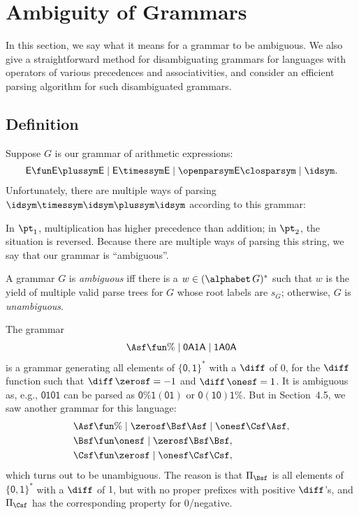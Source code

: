 \section{Ambiguity of Grammars}
\label{AmbiguityOfGrammars}

In this section, we say what it means for a grammar to be ambiguous.
We also give a straightforward method for disambiguating
grammars for languages with operators of various precedences and
associativities, and consider an efficient parsing algorithm for
such disambiguated grammars.

\subsection{Definition}

Suppose $G$ is our grammar of arithmetic expressions:
\begin{gather*}
\mathsf{E\fun E\plussym E\mid E\timessym E\mid \openparsym E\closparsym \mid
\idsym} .
\end{gather*}
Unfortunately,
there are multiple ways of parsing
$\idsym\timessym\idsym\plussym\idsym$ according to this grammar:
\begin{center}

\end{center}
In $\pt_1$, multiplication has higher precedence than addition; in
$\pt_2$, the situation is reversed.  Because there are multiple ways
of parsing this string, we say that our grammar is ``ambiguous''.

A grammar $G$ is \emph{ambiguous} iff there is a
$w\in(\alphabet\,G)^*$ such that $w$ is the yield of multiple valid
parse trees for $G$ whose root labels are $s_G$; otherwise, $G$ is
\emph{unambiguous}.

The grammar
\begin{gather*}
\Asf \fun \% \mid \mathsf{0A1A} \mid \mathsf{1A0A}
\end{gather*}
is a grammar generating all elements
of $\{\mathsf{0,1}\}^*$ with a $\diff$ of $0$, for the $\diff$
function such that $\diff\,\zerosf = -1$ and $\diff\,\onesf = 1$.
It is ambiguous as, e.g., $\mathsf{0101}$ can be parsed as
$\mathsf{0\%1(01)}$ or $\mathsf{0(10)1\%}$.
But in Section~4.5, we saw another grammar for this
language:
\begin{align*}
\Asf &\fun \% \mid \zerosf\Bsf\Asf \mid \onesf\Csf\Asf , \\
\Bsf &\fun \onesf \mid \zerosf\Bsf\Bsf , \\
\Csf &\fun \zerosf \mid \onesf\Csf\Csf ,
\end{align*}
which turns out to be unambiguous.
The reason is that $\Pi_\Bsf$ is all elements of $\{\mathsf{0,1}\}^*$
with a $\diff$ of $1$, but with no proper prefixes with positive
$\diff$'s, and $\Pi_\Csf$ has the corresponding property for
$0$/negative.

